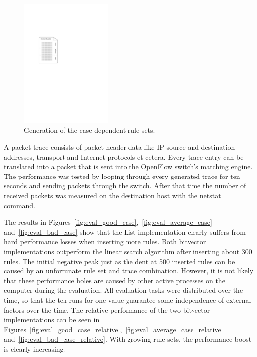 \documentclass[a4paper,
		12pt,
		parskip=full,
		titlepage
		]{scrartcl}
\begin{document}
\begin{figure}
\centering
\includegraphics[width=0.4\textwidth]{images/rule-thirds}
\caption{Generation of the case-dependent rule sets.}
\label{fig:rule-thirds}
\end{figure}

A packet trace consists of packet header data like IP source and destination addresses, transport and Internet protocols et cetera.
Every trace entry can be translated into a packet that is sent into the OpenFlow switch's matching engine.
The performance was tested by looping through every generated trace for ten seconds and sending packets through the switch.
After that time the number of received packets was measured on the destination host with the \textsf{netstat} command.

The results in Figures~\ref{fig:eval_good_case},~\ref{fig:eval_average_case} and~\ref{fig:eval_bad_case} show that the List implementation
clearly suffers from hard performance losses when inserting more rules.
Both bitvector implementations outperform the linear search algorithm after inserting about 300 rules.
The initial negative peak just as the dent at 500 inserted rules can be caused by an unfortunate rule set and trace combination.
However, it is not likely that these performance holes are caused by other active processes on the computer during the evaluation.
All evaluation tasks were distributed over the time, so that the ten runs 
for one value guarantee some independence of external factors over the time.
The relative performance of the two bitvector implementations can be seen in
Figures~\ref{fig:eval_good_case_relative},~\ref{fig:eval_average_case_relative} and~\ref{fig:eval_bad_case_relative}.
With growing rule sets, the performance boost is clearly increasing.
\end{document}
